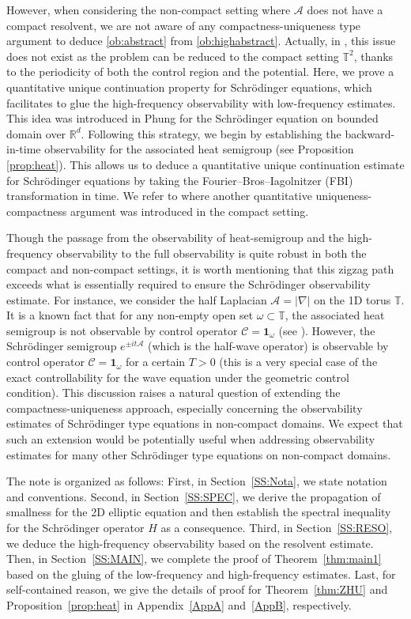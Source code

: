\documentclass[a4paper,reqno]{amsart}
\theoremstyle{definition}
\numberwithin{equation}{section}
\newcommand{\R}{\mathbb{R}}
\def \R {{\mathbb{R} }}
\begin{document}
\smallskip
However, when considering the non-compact setting where $\mathcal{A}$ does not have a compact resolvent, we are not aware of any compactness-uniqueness type argument to deduce \eqref{ob:abstract} from \eqref{ob:highabstract}. Actually, in \cite{MLe}, this issue does not exist as the problem can be reduced to the compact setting $\mathbb{T}^2$, thanks to the periodicity of both the control region and the potential. Here, we prove a quantitative unique continuation property for Schr\"odinger equations, which facilitates to glue the high-frequency observability with low-frequency estimates. This idea was introduced in Phung \cite{Phung01} for the Schr\"odinger equation on bounded domain over $\R^{d}$.  Following this strategy, we begin by establishing the backward-in-time observability for the associated heat semigroup (see Proposition \ref{prop:heat}). This allows us to deduce a quantitative unique continuation estimate for Schr\"odinger equations by taking the Fourier–Bros–Iagolnitzer (FBI) transformation in time. 
We refer to \cite[Appendix A]{BBZ} where another quantitative uniqueness-compactness argument was introduced in the compact setting.

\smallskip
Though the passage from the observability of heat-semigroup and the high-frequency observability to the full observability is quite robust in both the compact and non-compact settings, 
it is worth mentioning that this zigzag path exceeds what is essentially required to ensure the Schr\"odinger observability estimate.  For instance, we consider the half Laplacian $\mathcal{A}=|\nabla|$ on the 1D torus $\mathbb{T}$. It is a known fact that for any non-empty open set $\omega\subset \mathbb{T}$, the associated heat semigroup is not observable by control operator $\mathcal{C}=\mathbf{1}_{\omega}$ (see \cite[Subsection 2.1]{Koe}). However, the Schr\"odinger semigroup $e^{\pm it\mathcal{A}}$ (which is the half-wave operator) is observable by control operator $\mathcal{C}=\mathbf{1}_{\omega}$ for a certain $T>0$ (this is a very special case of the exact controllability for the wave equation under the geometric control condition). This discussion raises a natural question of extending the compactness-uniqueness approach, especially concerning the observability estimates of Schr\"odinger type equations in non-compact domains. We expect that such an extension would be potentially useful when addressing observability estimates for many other Schr\"odinger type equations on non-compact domains.

\smallskip
The note is organized as follows: First, in Section~\ref{SS:Nota}, we state notation and conventions. Second, in Section~\ref{SS:SPEC}, we derive the propagation of smallness for the 2D elliptic equation and then establish the spectral inequality for the Schr\"odinger operator $H$ as a consequence. Third, in Section~\ref{SS:RESO}, we deduce the high-frequency observability based on the resolvent estimate. Then, in Section~\ref{SS:MAIN}, we complete the proof of Theorem~\ref{thm:main1} based on the gluing of the low-frequency and high-frequency estimates. Last, for self-contained reason, we give the details of proof for Theorem~\ref{thm:ZHU} and Proposition~\ref{prop:heat} in Appendix~\ref{AppA} and~\ref{AppB}, respectively.
\end{document}
